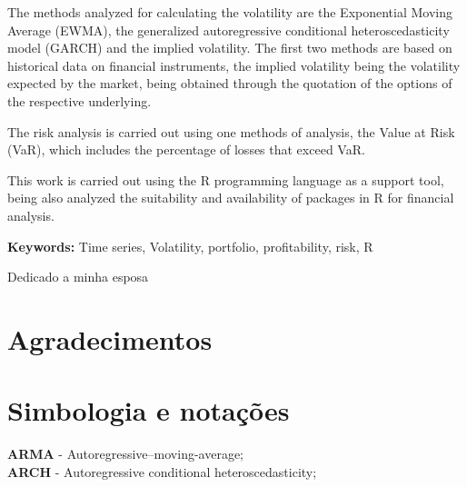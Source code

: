 \documentclass[
  12pt,
  a4paper,
  openany]{book}
\begin{document}
The methods analyzed for calculating the volatility are the Exponential Moving Average (EWMA), the generalized autoregressive conditional heteroscedasticity model (GARCH) and the implied volatility. The first two methods are based on historical data on financial instruments, the implied volatility being the volatility expected by the market, being obtained through the quotation of the options of the respective underlying.

The risk analysis is carried out using one methods of analysis, the Value at Risk (VaR), which includes the percentage of losses that exceed VaR.

This work is carried out using the R programming language as a support tool, being also analyzed the suitability and availability of packages in R for financial analysis.

\bigbreak

\noindent\textbf{Keywords:} Time series, Volatility, portfolio, profitability, risk, R

\newenvironment{dedication}
  {\clearpage           %
   \itshape             %
   \raggedleft          %
  }
  {\par %
   \vspace{\stretch{3}} %
   \clearpage           %
  }
\begin{dedication}
{\Large Dedicado a minha esposa\par}
\end{dedication}

\chapter*{Agradecimentos}

\renewcommand*\contentsname{Índice}
{
\setcounter{tocdepth}{2}
\tableofcontents
}
\listoftables
\listoffigures
{}
\hypertarget{simbologia-e-notauxe7uxf5es}{%
\chapter*{Simbologia e notações}\label{simbologia-e-notauxe7uxf5es}}

\textbf{ARMA} - Autoregressive--moving-average;\\

\textbf{ARCH} - Autoregressive conditional heteroscedasticity;\\
\end{document}

